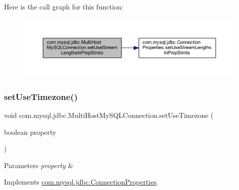 Here is the call graph for this function\+:
\nopagebreak
\begin{figure}[H]
\begin{center}
\leavevmode
\includegraphics[width=350pt]{classcom_1_1mysql_1_1jdbc_1_1_multi_host_my_s_q_l_connection_a29c813718362120ef1f0b6e6f0b7bb0a_cgraph}
\end{center}
\end{figure}
\mbox{\label{classcom_1_1mysql_1_1jdbc_1_1_multi_host_my_s_q_l_connection_a3854f7fb3b5d199edae3890e38bf9b7c}} 
\subsubsection{\texorpdfstring{set\+Use\+Timezone()}{setUseTimezone()}}
{\footnotesize\ttfamily void com.\+mysql.\+jdbc.\+Multi\+Host\+My\+S\+Q\+L\+Connection.\+set\+Use\+Timezone (\begin{DoxyParamCaption}\item[{boolean}]{property }\end{DoxyParamCaption})}


\begin{DoxyParams}{Parameters}
{\em property} & \\
\hline
\end{DoxyParams}


Implements \mbox{\hyperlink{interfacecom_1_1mysql_1_1jdbc_1_1_connection_properties_a7f57a800fefe86a58c1ddfe7fd7d8ef2}{com.\+mysql.\+jdbc.\+Connection\+Properties}}.

